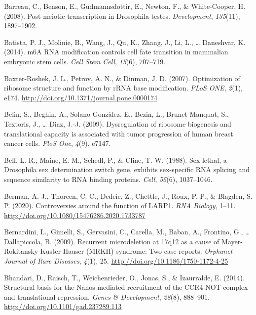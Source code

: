 \documentclass[12pt,twoside]{reedthesis}
\newlength{\cslhangindent}
\newenvironment{cslreferences}%
  {\setlength{\parindent}{0pt}%
  \everypar{\setlength{\hangindent}{\cslhangindent}}\ignorespaces}%
  {\par}
\begin{document}
\begin{cslreferences}
\leavevmode\hypertarget{ref-Barreau2008d}{}%
Barreau, C., Benson, E., Gudmannsdottir, E., Newton, F., \& White-Cooper, H. (2008). Post-meiotic transcription in Drosophila testes. \emph{Development}, \emph{135}(11), 1897--1902.

\leavevmode\hypertarget{ref-Batista2014}{}%
Batista, P. J., Molinie, B., Wang, J., Qu, K., Zhang, J., Li, L., \ldots{} Daneshvar, K. (2014). m6A RNA modification controls cell fate transition in mammalian embryonic stem cells. \emph{Cell Stem Cell}, \emph{15}(6), 707--719.

\leavevmode\hypertarget{ref-Baxter-Roshek2007f}{}%
Baxter-Roshek, J. L., Petrov, A. N., \& Dinman, J. D. (2007). Optimization of ribosome structure and function by rRNA base modification. \emph{PLoS ONE}, \emph{2}(1), e174. \url{http://doi.org/10.1371/journal.pone.0000174}

\leavevmode\hypertarget{ref-Belin2009a}{}%
Belin, S., Beghin, A., Solano-Gonzàlez, E., Bezin, L., Brunet-Manquat, S., Textoris, J., \ldots{} Diaz, J.-J. (2009). Dysregulation of ribosome biogenesis and translational capacity is associated with tumor progression of human breast cancer cells. \emph{PloS One}, \emph{4}(9), e7147.

\leavevmode\hypertarget{ref-Bell1988}{}%
Bell, L. R., Maine, E. M., Schedl, P., \& Cline, T. W. (1988). Sex-lethal, a Drosophila sex determination switch gene, exhibits sex-specific RNA splicing and sequence similarity to RNA binding proteins. \emph{Cell}, \emph{55}(6), 1037--1046.

\leavevmode\hypertarget{ref-bermanControversiesFunctionLARP12020}{}%
Berman, A. J., Thoreen, C. C., Dedeic, Z., Chettle, J., Roux, P. P., \& Blagden, S. P. (2020). Controversies around the function of LARP1. \emph{RNA Biology}, 1--11. \url{http://doi.org/10.1080/15476286.2020.1733787}

\leavevmode\hypertarget{ref-bernardiniRecurrentMicrodeletion17q122009}{}%
Bernardini, L., Gimelli, S., Gervasini, C., Carella, M., Baban, A., Frontino, G., \ldots{} Dallapiccola, B. (2009). Recurrent microdeletion at 17q12 as a cause of Mayer-Rokitansky-Kuster-Hauser (MRKH) syndrome: Two case reports. \emph{Orphanet Journal of Rare Diseases}, \emph{4}(1), 25. \url{http://doi.org/10.1186/1750-1172-4-25}

\leavevmode\hypertarget{ref-Bhandari2014h}{}%
Bhandari, D., Raisch, T., Weichenrieder, O., Jonas, S., \& Izaurralde, E. (2014). Structural basis for the Nanos-mediated recruitment of the CCR4-NOT complex and translational repression. \emph{Genes \& Development}, \emph{28}(8), 888--901. \url{http://doi.org/10.1101/gad.237289.113}


\end{cslreferences}
\end{document}
